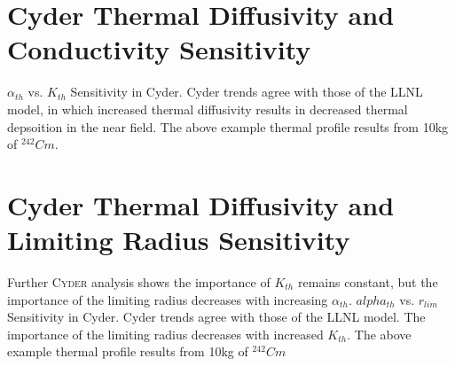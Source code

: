 \documentclass[letterpaper]{article}
\newcommand{\Cyder}{\textsc{Cyder}\xspace}
\begin{document}
\section*{Cyder Thermal Diffusivity and Conductivity Sensitivity}
$\alpha_{th}$ vs. $K_{th}$ Sensitivity in Cyder. Cyder trends agree
  with those of the LLNL model, in which increased thermal diffusivity results 
  in 
  decreased thermal depsoition in the near field. The above example thermal 
  profile results from 10kg of $^{242}Cm$.

\section*{Cyder Thermal Diffusivity and Limiting Radius Sensitivity}
  Further \Cyder analysis shows the importance of $K_{th}$ remains constant, 
  but 
  the importance of the limiting radius decreases with increasing 
  $\alpha_{th}$.
  $alpha_{th}$ vs. $r_{lim}$ Sensitivity in Cyder.
  Cyder trends agree with 
  those of the LLNL model. The importance of the limiting radius decreases with 
  increased $K_{th}$. The above example thermal profile results from 10kg of 
  $^{242}Cm$

\pagebreak


\end{document}
